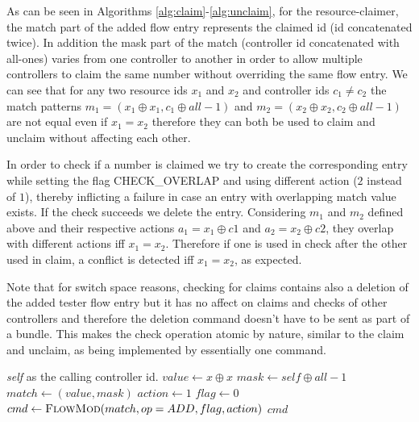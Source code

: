 \documentclass[conference]{sigcomm-alternate}
\newcommand{\concat}[0]{\oplus}
\newcommand{\claimcheck}{check\xspace}
\begin{document}
 As can be seen in Algorithms \ref{alg:claim}-\ref{alg:unclaim}, for the resource-claimer,
  the match part of the added flow entry represents the claimed id (id concatenated twice).
   In addition the mask part of the match (controller id concatenated with all-ones) varies from one controller to another in order to allow multiple controllers to claim the same number without overriding the same flow entry.
    We can see that for any two resource ids $x_1$ and $x_2$ and controller ids $c_1\neq c_2$ the match patterns $m_1=(x_1\concat x_1, c_1\concat all-1)$ and $ m_2=(x_2\concat x_2, c_2\concat all-1)$ are not equal even if $x_1=x_2$ therefore they can both be used to claim and unclaim without affecting each other.

In order to check if a number is claimed we try to create the corresponding entry while setting the
flag \textsf{CHECK\_OVERLAP} and using different action ($2$ instead of $1$), thereby inflicting a failure in case an entry with overlapping match value exists. If the check succeeds we delete the entry. Considering $m_1$ and $m_2$ defined above and their respective actions $a_1=x_1\concat c1$ and $a_2=x_2\concat c2$,  they overlap with different actions iff $x_1=x_2$. Therefore if one is used in \claimcheck after the other used in claim, a conflict is detected iff $x_1=x_2$, as expected.

Note that for switch space reasons, checking for claims contains also a deletion of the added tester flow entry but it has no affect on claims and checks of other controllers and therefore the deletion command doesn't have to be sent as part of a bundle. This makes the \textsf{\claimcheck} operation atomic by nature, similar to the \textsf{claim} and \textsf{unclaim}, as being implemented by essentially one command.




\begin{algorithm}[H]
    \caption{$\textit{claim}(x)$}
    \label{alg:claim}
    \begin{algorithmic}[1]
    \Require \emph{self} as the calling controller id.
    		\State $value \gets x\concat x$
    		\State $mask \gets self\concat all-1$
	    	\State $match \gets (value,mask)$
    		\State $action \gets 1$
    		\State $flag \gets 0$
    		\State $cmd\gets \textsc{FlowMod}(match, op = ADD, flag, action) $
			\Return $cmd$
    \end{algorithmic}
\end{algorithm}
\end{document}
